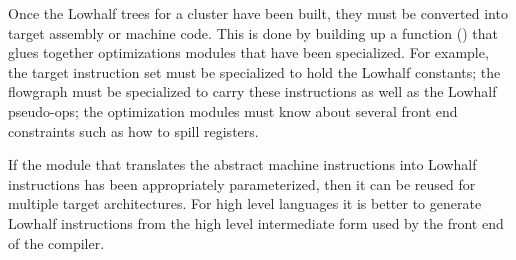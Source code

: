 \begin{enumerate}
   Once the Lowhalf trees for a cluster have been built, they must
  be converted into target assembly or machine code. This is done by
  building up a function () that
  glues together optimizations modules that have been specialized. For
  example, the target instruction set must be specialized to hold the
  Lowhalf constants; the flowgraph must be specialized to carry these
  instructions as well as the Lowhalf pseudo-ops; the optimization
  modules must know about several front end constraints such as how to
  spill registers.
  \end{enumerate}

   If the module that translates the abstract machine instructions
  into Lowhalf instructions has been appropriately parameterized, then
  it can be reused for multiple target architectures. For high level
  languages it is better to generate Lowhalf instructions from the high
  level intermediate form used by the front end of the compiler.
